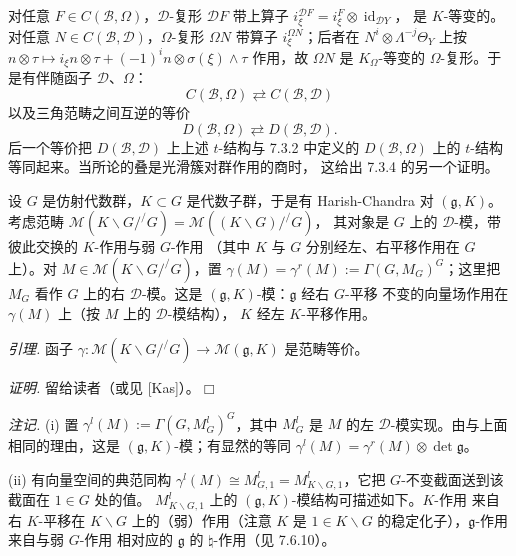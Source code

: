 对任意 $F\in C(\mathcal{B},\Omega)$，$\mathcal{D}$-复形 $\mathcal{D}F$
带上算子 $i_\xi^{\mathcal{D}F}=i_\xi^F\otimes\operatorname{id}_{\mathcal{D}Y}$，
是 $K$-等变的。对任意 $N\in C(\mathcal{B},\mathcal{D})$，$\Omega$-复形
$\Omega N$ 带算子 $i_\xi^{\Omega N}$；后者在
$N^i\otimes\Lambda^{-j}\Theta_Y$ 上按
$n\otimes\tau\mapsto i_\xi n\otimes\tau+(-1)^in\otimes\sigma(\xi)\wedge\tau$
作用，故 $\Omega N$ 是 $K_\Omega$-等变的 $\Omega$-复形。于是有伴随函子
$\mathcal{D}$、$\Omega$：
\begin{equation}\tag{322}
C(\mathcal{B},\Omega)\rightleftarrows C(\mathcal{B},\mathcal{D})
\end{equation}
以及三角范畴之间互逆的等价
\begin{equation}\tag{323}
D(\mathcal{B},\Omega)\rightleftarrows D(\mathcal{B},\mathcal{D}).
\end{equation}
后一个等价把 $D(\mathcal{B},\mathcal{D})$ 上上述 $t$-结构与 7.3.2 中定义的
$D(\mathcal{B},\Omega)$ 上的 $t$-结构等同起来。当所论的叠是光滑簇对群作用的商时，
这给出 7.3.4 的另一个证明。



 设 $G$ 是仿射代数群，$K\subset G$ 是代数子群，于是有
Harish-Chandra 对 $(\mathfrak{g},K)$。考虑范畴
$\mathcal{M}(K\backslash G/^{/}G)=\mathcal{M}((K\backslash G)/^{/}G)$，
其对象是 $G$ 上的 $\mathcal{D}$-模，带彼此交换的 $K$-作用与弱 $G$-作用
（其中 $K$ 与 $G$ 分别经左、右平移作用在 $G$ 上）。对
$M\in\mathcal{M}(K\backslash G/^{/}G)$，置
$\gamma(M)=\gamma^r(M):=\Gamma(G,M_G)^G$；这里把 $M_G$ 看作 $G$ 上的右
$\mathcal{D}$-模。这是 $(\mathfrak{g},K)$-模：$\mathfrak{g}$ 经右 $G$-平移
不变的向量场作用在 $\gamma(M)$ 上（按 $M$ 上的 $\mathcal{D}$-模结构），
$K$ 经左 $K$-平移作用。

 \emph{引理.} 函子
$\gamma:\mathcal{M}(K\backslash G/^{/}G)\to\mathcal{M}(\mathfrak{g},K)$
是范畴等价。

\emph{证明.} 留给读者（或见 [Kas]）。\hfill$\Box$

 \emph{注记.} (i) 置 $\gamma^l(M):=\Gamma(G,M^l_G)^G$，其中
$M^l_G$ 是 $M$ 的左 $\mathcal{D}$-模实现。由与上面相同的理由，这是
$(\mathfrak{g},K)$-模；有显然的等同
$\gamma^l(M)=\gamma^r(M)\otimes\det\mathfrak{g}$。

(ii) 有向量空间的典范同构 $\gamma^l(M)\cong M^l_{G,1}
=M^l_{K\backslash G,1}$，它把 $G$-不变截面送到该截面在 $1\in G$ 处的值。
$M^l_{K\backslash G,1}$ 上的 $(\mathfrak{g},K)$-模结构可描述如下。$K$-作用
来自右 $K$-平移在 $K\backslash G$ 上的（弱）作用（注意 $K$ 是
$1\in K\backslash G$ 的稳定化子），$\mathfrak{g}$-作用来自与弱 $G$-作用
相对应的 $\mathfrak{g}$ 的 $\natural$-作用（见 7.6.10）。

